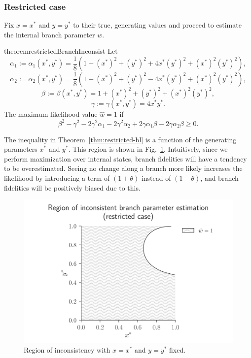 \documentclass{article}
\begin{document}
\subsubsection*{Restricted case}

Fix $x=x^*$ and $y=y^*$ to their true, generating values and proceed to estimate the internal branch parameter $w$.
\begin{restatable}{theorem}{restrictedBranchInconsist}
\label{thm:restricted-bl}
Let
$$
\alpha_1 := \alpha_1(x^*, y^*) = \frac{1}{8} \left(1+(x^*)^2+(y^*)^2+4x^*(y^*)^2+(x^*)^2(y^*)^2\right),
$$
$$
\alpha_2 := \alpha_2(x^*, y^*) = \frac{1}{8}\left(1+(x^*)^2+(y^*)^2-4x^*(y^*)^2+(x^*)^2(y^*)^2\right),
$$
$$
\beta := \beta(x^*, y^*) = 1+(x^*)^2+(y^*)^2+(x^*)^2(y^*)^2,
$$
$$
\gamma := \gamma(x^*, y^*) = 4x^*y^*.
$$
The maximum likelihood value $\hat{w} = 1$ if
$$
\beta^2-\gamma^2-2\gamma^2\alpha_1-2\gamma^2\alpha_2+2\gamma\alpha_1\beta-2\gamma\alpha_2\beta \ge 0.
$$
\end{restatable}
The inequality in Theorem~\ref{thm:restricted-bl} is a function of the generating parameters $x^*$ and $y^*$.
This region is shown in Fig.~\ref{fig:bl-inconsistency}.
Intuitively, since we perform maximization over internal states, branch fidelities will have a tendency to be overestimated.
Seeing no change along a branch more likely increases the likelihood by introducing a term of $(1+\theta)$ instead of $(1-\theta)$, and branch fidelities will be positively biased due to this.

\begin{figure}
\centering
\includegraphics[width=\textwidth]{branch-length-inconsistency-inkscape}
\caption{Region of inconsistency with $x=x^*$ and $y=y^*$ fixed.}
\label{fig:bl-inconsistency}
\end{figure}
\end{document}

